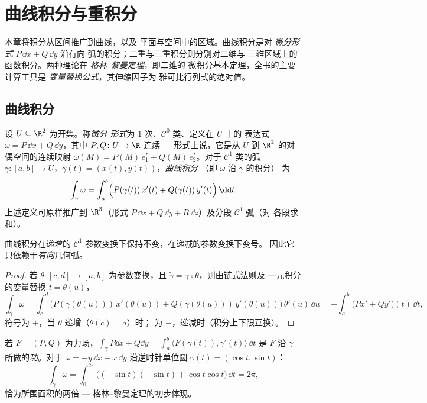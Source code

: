 \chapter{曲线积分与重积分}\label{ch:b2:multint}

本章将积分从区间推广到曲线，以及
平面与空间中的区域。曲线积分是对
\emph{微分形式} $P\,\dd x + Q\,\dd y$ 沿有向
弧的积分；二重与三重积分则分别对二维与
三维区域上的函数积分。两种理论在
\emph{格林--黎曼定理}，即二维的
微积分基本定理，全书的主要计算工具是
\emph{变量替换公式}，其伸缩因子为
雅可比行列式的绝对值。

\section{曲线积分}

\begin{definition}\label{def:b2:multint:lineint}
设 $U \subseteq \R^2$ 为开集。称\emph{微分
形式}为
$1$ 次、$\mathcal{C}^0$ 类、定义在 $U$ 上的
表达式 $\omega = P\,\dd x + Q\,\dd y$，其中 $P, Q \colon U \to \R$
连续 --- 形式上说，它是从 $U$ 到
$\R^2$ 的对偶空间的连续映射 $\omega(M) = P(M)\,e_1^* + Q(M)\,e_2^*$。对于
$\mathcal{C}^1$ 类的弧 $\gamma \colon [a, b] \to U$，$\gamma(t) =
(x(t), y(t))$，\emph{曲线积分}
（即 $\omega$ 沿 $\gamma$ 的积分）
为
\[
\int_\gamma \omega
= \int_a^b \Bigl(P(\gamma(t))\,x'(t)
+ Q(\gamma(t))\,y'(t)\Bigr)\,\dd t .
\]
上述定义可原样推广到 $\R^3$（形式 $P\,\dd x +
Q\,\dd y + R\,\dd z$）及分段 $\mathcal{C}^1$ 弧（对
各段求和）。
\end{definition}

\begin{proposition}[不变性与定向]\label{prop:b2:multint:lineinv}
曲线积分在递增的 $\mathcal{C}^1$
参数变换下保持不变，在递减的参数变换下变号。
因此它只依赖于\emph{有向}几何弧。
\end{proposition}

\begin{proof}
若 $\theta \colon [c, d] \to [a, b]$ 为参数变换，且
$\tilde\gamma = \gamma \circ \theta$，则由链式法则及
一元积分的变量替换 $t = \theta(u)$，
\[
\int_{\tilde\gamma}\omega
= \int_c^d \bigl(P(\gamma(\theta(u)))\,x'(\theta(u))
+ Q(\gamma(\theta(u)))\,y'(\theta(u))\bigr)\,\theta'(u)\,\dd u
= \pm\int_a^b \bigl(Px' + Qy'\bigr)(t)\,\dd t ,
\]
符号为 $+$，当 $\theta$ 递增（$\theta(c) = a$）时；
为 $-$，递减时（积分上下限互换）。
\end{proof}

\begin{example}[力所做的功；环量]\label{ex:b2:multint:work}
若 $F = (P, Q)$ 为力场，$\int_\gamma P\dd x + Q\dd y =
\int_a^b \langle F(\gamma(t)), \gamma'(t)\rangle\,\dd t$ 是
$F$ 沿 $\gamma$ 所做的\emph{功}。对于 $\omega = -y\,\dd x +
x\,\dd y$ 沿逆时针单位圆 $\gamma(t) =
(\cos t, \sin t)$：
\[
\int_\gamma \omega
= \int_0^{2\pi}\bigl((-\sin t)(-\sin t)
+ \cos t\cos t\bigr)\,\dd t = 2\pi ,
\]
恰为所围面积的两倍 --- 格林--黎曼定理的初步体现。
\end{example}

